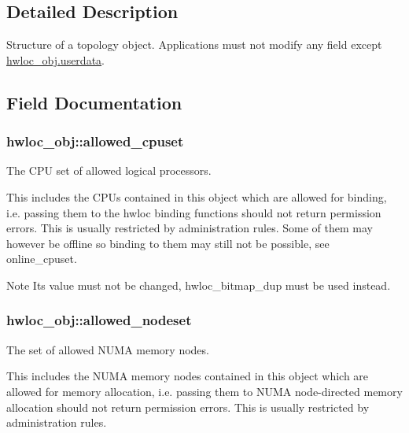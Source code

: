 \subsection{Detailed Description}
Structure of a topology object. Applications must not modify any field except \hyperlink{a00016_a76fd3ac94401cf32dfccc3a3a8de68a5}{hwloc\_\-obj.userdata}. 

\subsection{Field Documentation}
\hypertarget{a00016_afa3c59a6dd3da8ffa48710780a1bfb34}{
\subsubsection[{allowed\_\-cpuset}]{ {\bf hwloc\_\-obj::allowed\_\-cpuset}}}
\label{a00016_afa3c59a6dd3da8ffa48710780a1bfb34}


The CPU set of allowed logical processors. 

This includes the CPUs contained in this object which are allowed for binding, i.e. passing them to the hwloc binding functions should not return permission errors. This is usually restricted by administration rules. Some of them may however be offline so binding to them may still not be possible, see online\_\-cpuset.

\begin{DoxyNote}{Note}
Its value must not be changed, hwloc\_\-bitmap\_\-dup must be used instead. 
\end{DoxyNote}
\hypertarget{a00016_a19e3d0a5951a7510fc4fc4722a9bf531}{
\subsubsection[{allowed\_\-nodeset}]{ {\bf hwloc\_\-obj::allowed\_\-nodeset}}}
\label{a00016_a19e3d0a5951a7510fc4fc4722a9bf531}


The set of allowed NUMA memory nodes. 

This includes the NUMA memory nodes contained in this object which are allowed for memory allocation, i.e. passing them to NUMA node-\/directed memory allocation should not return permission errors. This is usually restricted by administration rules.

